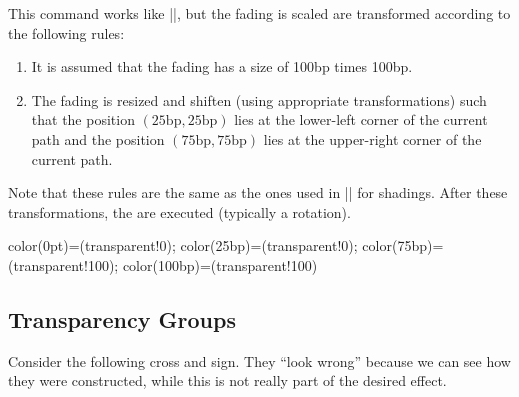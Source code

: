 \begin{command}{\pgfsetfadingforcurrentpath{}}
  This command works like |\pgfsetfading|, but the fading is scaled
  are transformed according to the following rules:
  \begin{enumerate}
  \item
    It is assumed that the fading has a size of 100bp times 100bp.
  \item
    The fading is resized and shiften (using appropriate
    transformations) such that the position
    $(25\mathrm{bp},25\mathrm{bp})$ lies at the lower-left corner of
    the current path and the position $(75\mathrm{bp},75\mathrm{bp})$
    lies at the upper-right corner of the current path.
  \end{enumerate}
  Note that these rules are the same as the ones used in
  |\pgfshadepath| for shadings. After these transformations, the
   are executed (typically a rotation).
\begin{codeexample}[]
{ color(0pt)=(transparent!0);    color(25bp)=(transparent!0);
  color(75bp)=(transparent!100); color(100bp)=(transparent!100)}


\end{codeexample}

\end{command}

\subsection{Transparency Groups}

Consider the following cross and sign. They ``look wrong'' because we
can see how they were constructed, while this is not really part of
the desired effect. 


